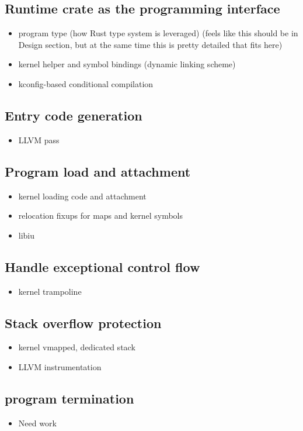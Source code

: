 \subsection{Runtime crate as the programming interface}
\begin{itemize}
    \item program type (how Rust type system is leveraged) (feels like this
        should be in Design section, but at the same time this is pretty
        detailed that fits here)
    \item kernel helper and symbol bindings (dynamic linking scheme)
    \item kconfig-based conditional compilation
\end{itemize}

\subsection{Entry code generation}
\begin{itemize}
    \item LLVM pass
\end{itemize}

\subsection{Program load and attachment}
\begin{itemize}
    \item kernel loading code and attachment
    \item relocation fixups for maps and kernel symbols
    \item libiu
\end{itemize}

\subsection{Handle exceptional control flow}
\begin{itemize}
    \item kernel trampoline
\end{itemize}

\subsection{Stack overflow protection}
\begin{itemize}
    \item kernel vmapped, dedicated stack
    \item LLVM instrumentation
\end{itemize}

\subsection{program termination}
\begin{itemize}
    \item Need work
\end{itemize}

